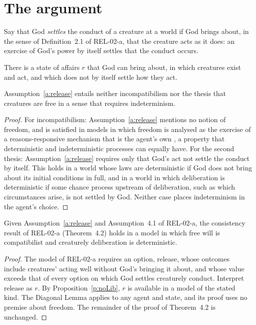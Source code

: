 \documentclass{situationist-preprint}
\begin{document}
\section{The argument}

Say that God \emph{settles} the conduct of a creature at a world if God brings about, in the sense of Definition~2.1 of REL-02-a, that the creature acts as it does: an exercise of God's power by itself settles that the conduct occurs.

\begin{assumption}[Release]\label{a:release}
There is a state of affairs $r$ that God can bring about, in which creatures exist and act, and which does not by itself settle how they act.
\end{assumption}

\begin{proposition}\label{p:noLib}
Assumption~\ref{a:release} entails neither incompatibilism nor the thesis that creatures are free in a sense that requires indeterminism.
\end{proposition}

\begin{proof}
For incompatibilism: Assumption~\ref{a:release} mentions no notion of freedom, and is satisfied in models in which freedom is analysed as the exercise of a reasons-responsive mechanism that is the agent's own \citep{FischerRavizza1998}, a property that deterministic and indeterministic processes can equally have. For the second thesis: Assumption~\ref{a:release} requires only that God's act not settle the conduct by itself. This holds in a world whose laws are deterministic if God does not bring about its initial conditions in full, and in a world in which deliberation is deterministic if some chance process upstream of deliberation, such as which circumstances arise, is not settled by God. Neither case places indeterminism in the agent's choice.
\end{proof}

\begin{proposition}\label{p:defence}
Given Assumption~\ref{a:release} and Assumption~4.1 of REL-02-a, the consistency result of REL-02-a (Theorem~4.2) holds in a model in which free will is compatibilist and creaturely deliberation is deterministic.
\end{proposition}

\begin{proof}
The model of REL-02-a requires an option, release, whose outcomes include creatures' acting well without God's bringing it about, and whose value exceeds that of every option on which God settles creaturely conduct. Interpret release as $r$. By Proposition~\ref{p:noLib}, $r$ is available in a model of the stated kind. The Diagonal Lemma applies to any agent and state, and its proof uses no premise about freedom. The remainder of the proof of Theorem~4.2 is unchanged.
\end{proof}
\end{document}
